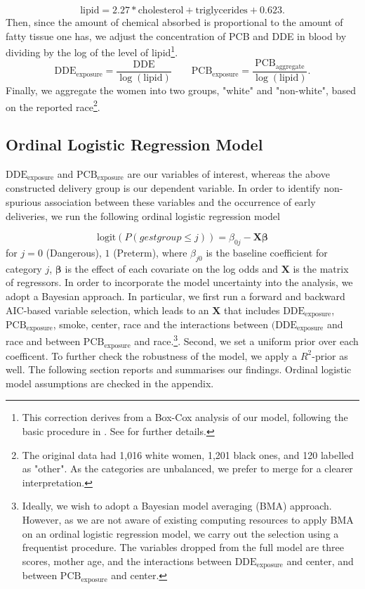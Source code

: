 \documentclass[10pt]{jmlr}%
\begin{document}
\begin{equation}
\label{eq:fat}
\text{lipid} = 2.27 * \text{cholesterol} + \text{triglycerides} + 0.623.
\end{equation}
Then, since the amount of chemical absorbed is proportional to the amount of fatty tissue one has, we adjust the concentration of PCB and DDE in blood by dividing by the log of the level of lipid\footnote{This correction derives from a Box-Cox analysis of our model, following the basic procedure in \cite{Li_Long_Duns}. See  for further details.}.
\begin{equation}
\label{eq:exp_dde_pcb}
\text{DDE}_{\text{exposure}} = \dfrac{\text{DDE}}{\log(\text{lipid})} \qquad \text{PCB}_{\text{exposure}} = \dfrac{\text{PCB}_\text{aggregate}}{\log(\text{lipid})}.
\end{equation}
Finally, we aggregate the women into two groups, "white" and "non-white", based on the reported race\footnote{The original data had 1,016 white women, 1,201 black ones, and 120 labelled as "other". As the categories are unbalanced, we prefer to merge for a clearer interpretation.}.

\subsection{Ordinal Logistic Regression Model}
$\text{DDE}_{\text{exposure}}$ and $\text{PCB}_{\text{exposure}}$ are our variables of interest, whereas the above constructed delivery group is our dependent variable. In order to identify non-spurious association between these variables and the occurrence of early deliveries, we run the following ordinal logistic regression model 

\begin{equation}
\label{eq:ordi_logit}
\text{logit}(P(gestgroup \le j)) = \beta_{0j} - \mathbf{X} \boldsymbol{\beta}
\end{equation}
for $j=0$ (Dangerous), $1$ (Preterm), where $\beta_{j0}$ is the baseline coefficient for category $j$, $\boldsymbol{\beta}$ is the effect of each covariate on the log odds and $\mathbf{X}$ is the matrix of regressors. In order to incorporate the model uncertainty into the analysis, we adopt a Bayesian approach. In particular, we first run a forward and backward AIC-based variable selection, which leads to an $\mathbf{X}$ that includes $\text{DDE}_{\text{exposure}}$, $\text{PCB}_{\text{exposure}}$, smoke, center, race and the interactions between $(\text{DDE}_{\text{exposure}}$ and race and between $\text{PCB}_{\text{exposure}}$ and race.\footnote{Ideally, we wish to adopt a Bayesian model averaging (BMA) approach. However, as we are not aware of existing computing resources to apply BMA on an ordinal logistic regression model, we carry out the selection using a frequentist procedure. The variables dropped from the full model are three scores, mother age, and the interactions between $\text{DDE}_{\text{exposure}}$ and center, and between $\text{PCB}_{\text{exposure}}$ and center.}. Second, we set a uniform prior over each coefficent. To further check the robustness of the model, we apply a $R^2$-prior as well. The following section reports and summarises our findings. Ordinal logistic model assumptions are checked in the appendix.
\end{document}
